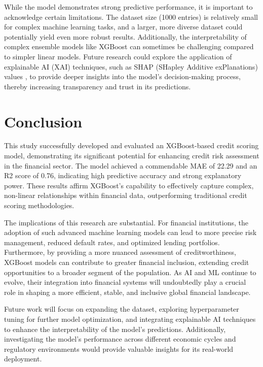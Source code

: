 \documentclass{article}
\begin{document}
While the model demonstrates strong predictive performance, it is important to acknowledge certain limitations. The dataset size (1000 entries) is relatively small for complex machine learning tasks, and a larger, more diverse dataset could potentially yield even more robust results. Additionally, the interpretability of complex ensemble models like XGBoost can sometimes be challenging compared to simpler linear models. Future research could explore the application of explainable AI (XAI) techniques, such as SHAP (SHapley Additive exPlanations) values \cite{lundberg2017unified}, to provide deeper insights into the model's decision-making process, thereby increasing transparency and trust in its predictions.

\section{Conclusion}

This study successfully developed and evaluated an XGBoost-based credit scoring model, demonstrating its significant potential for enhancing credit risk assessment in the financial sector. The model achieved a commendable MAE of 22.29 and an R2 score of 0.76, indicating high predictive accuracy and strong explanatory power. These results affirm XGBoost's capability to effectively capture complex, non-linear relationships within financial data, outperforming traditional credit scoring methodologies.

The implications of this research are substantial. For financial institutions, the adoption of such advanced machine learning models can lead to more precise risk management, reduced default rates, and optimized lending portfolios. Furthermore, by providing a more nuanced assessment of creditworthiness, XGBoost models can contribute to greater financial inclusion, extending credit opportunities to a broader segment of the population. As AI and ML continue to evolve, their integration into financial systems will undoubtedly play a crucial role in shaping a more efficient, stable, and inclusive global financial landscape.

Future work will focus on expanding the dataset, exploring hyperparameter tuning for further model optimization, and integrating explainable AI techniques to enhance the interpretability of the model's predictions. Additionally, investigating the model's performance across different economic cycles and regulatory environments would provide valuable insights for its real-world deployment.
\end{document}
